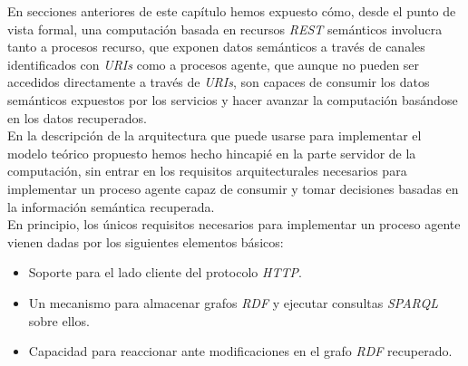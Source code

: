 En secciones anteriores de este cap\'itulo hemos expuesto c\'omo, desde el punto de vista formal, una computaci\'on basada en recursos \textit{REST} sem\'anticos involucra tanto a procesos recurso, que exponen datos sem\'anticos a trav\'es de canales identificados con \textit{URIs} como a procesos agente, que aunque no pueden ser accedidos directamente a trav\'es de \textit{URIs}, son capaces de consumir los datos sem\'anticos expuestos por los servicios y hacer avanzar la computaci\'on bas\'andose en los datos recuperados.\\
En la descripci\'on de la arquitectura que puede usarse para implementar el modelo te\'orico propuesto hemos hecho hincapi\'e en la parte servidor de la computaci\'on, sin entrar en los requisitos arquitecturales necesarios para implementar un proceso agente capaz de consumir y tomar decisiones basadas en la informaci\'on sem\'antica recuperada.\\
En principio, los \'unicos requisitos necesarios para implementar un proceso agente vienen dadas por los siguientes elementos b\'asicos:

\begin{itemize}
\item Soporte para el lado cliente del protocolo \textit{HTTP}.
\item Un mecanismo para almacenar grafos \textit{RDF} y ejecutar consultas \textit{SPARQL} sobre ellos.
\item Capacidad para reaccionar ante modificaciones en el grafo \textit{RDF} recuperado.
\end{itemize}

